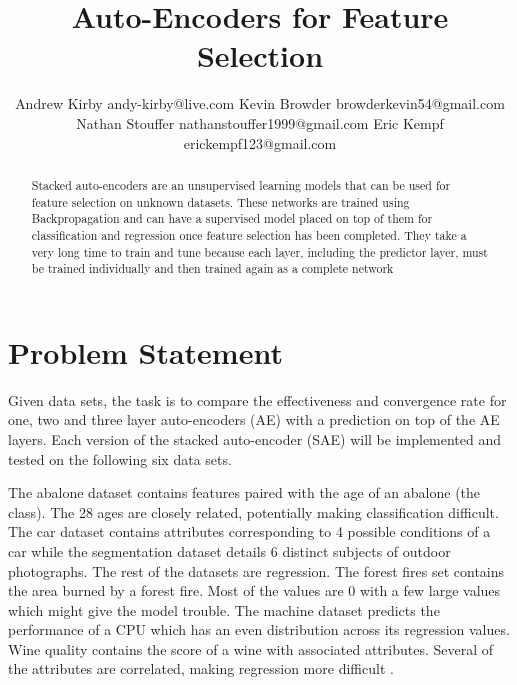 \documentclass[twoside,11pt]{article}
\begin{document}
\title{Auto-Encoders for Feature Selection}

\author{\name Andrew Kirby \email andy-kirby@live.com \AND
		\name Kevin Browder \email browderkevin54@gmail.com \AND
		\name Nathan Stouffer \email nathanstouffer1999@gmail.com \AND
		\name Eric Kempf \email erickempf123@gmail.com }

\maketitle

\begin{abstract}
Stacked auto-encoders are an unsupervised learning models that can be used for feature selection on unknown datasets. These networks are trained using Backpropagation and can have a supervised model placed on top of them for classification and regression once feature selection has been completed. They take a very long time to train and tune because each layer, including the predictor layer, must be trained individually and then trained again as a complete network
\end{abstract}

\section{Problem Statement}
	Given data sets, the task is to compare the effectiveness and convergence rate for one, two and three layer auto-encoders (AE) with a prediction on top of the AE layers. Each version of the stacked auto-encoder (SAE) will be implemented and tested on the following six data sets.
		
	The abalone dataset contains features paired with the age of an abalone (the class). The 28 ages are closely related, potentially making classification difficult.
	The car dataset contains attributes corresponding to 4 possible conditions of a car while the segmentation dataset details 6 distinct subjects of outdoor photographs.
	The rest of the datasets are regression.
	The forest fires set contains the area burned by a forest fire. Most of the values are 0 with a few large values which might give the model trouble.
	The machine dataset predicts the performance of a CPU which has an even distribution across its regression values. Wine quality contains the score of a wine with associated attributes. Several of the attributes are correlated, making regression more difficult \citep{datasets}.
	
\end{document}
